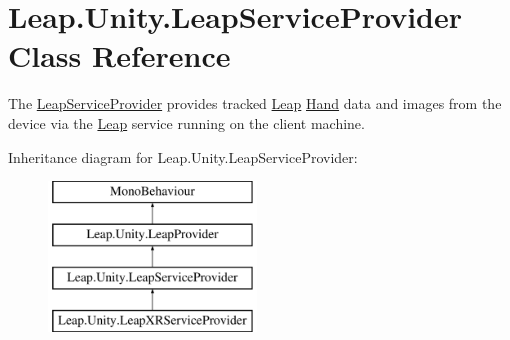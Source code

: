 \hypertarget{class_leap_1_1_unity_1_1_leap_service_provider}{}\section{Leap.\+Unity.\+Leap\+Service\+Provider Class Reference}
\label{class_leap_1_1_unity_1_1_leap_service_provider}


The \mbox{\hyperlink{class_leap_1_1_unity_1_1_leap_service_provider}{Leap\+Service\+Provider}} provides tracked \mbox{\hyperlink{namespace_leap_1_1_unity_1_1_leap}{Leap}} \mbox{\hyperlink{class_leap_1_1_hand}{Hand}} data and images from the device via the \mbox{\hyperlink{namespace_leap_1_1_unity_1_1_leap}{Leap}} service running on the client machine.  


Inheritance diagram for Leap.\+Unity.\+Leap\+Service\+Provider\+:\begin{figure}[H]
\begin{center}
\leavevmode
\includegraphics[height=4.000000cm]{class_leap_1_1_unity_1_1_leap_service_provider}
\end{center}
\end{figure}
